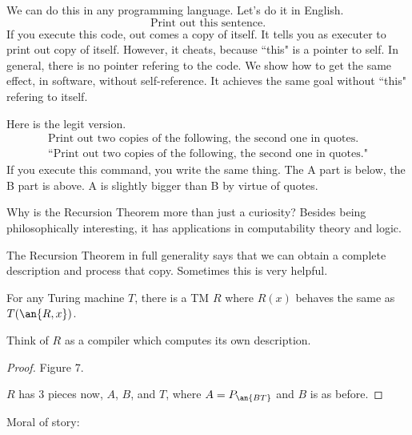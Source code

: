 We can do this in any programming language. Let's do it in English.
\[
\text{Print out this sentence.}
\]
If you execute this code, out comes a copy of itself. It tells you as executer to print out copy of itself. However, it cheats, because ``this" is a pointer to self. In general, there is no pointer refering to the code. We show how to get the same effect, in software, without self-reference. It achieves the same goal without ``this" refering to itself.

Here is the legit version.
\begin{gather*}
\text{Print out two copies of the following, the second one in quotes.}\\
\text{``Print out two copies of the following, the second one in quotes."}
\end{gather*}
If you execute this command, you write the same thing. The A part is below, the B part is above. A is slightly bigger than B by virtue of quotes.

Why is the Recursion Theorem more than just a curiosity? Besides being philosophically interesting, it has applications in computability theory and logic. %




The Recursion Theorem in full generality says that we can obtain a complete description and process that copy. Sometimes this is very helpful.
\begin{thm}
For any Turing machine $T$, there is a TM $R$ where $R(x)$ behaves the same as $T(\an{R,x})$. 
\end{thm}
Think of $R$ as a compiler which computes its own description. 
\begin{proof}
Figure 7.

$R$ has 3 pieces now, $A$, $B$, and $T$, where $A=P_{\an{BT}}$ and $B$ is as before. 
\end{proof}
Moral of story:\\

